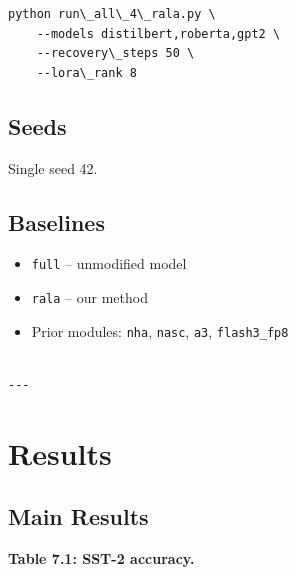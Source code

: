 \begin{lstlisting}
python run\_all\_4\_rala.py \
    --models distilbert,roberta,gpt2 \
    --recovery\_steps 50 \
    --lora\_rank 8
\end{lstlisting}

\subsection{Seeds}

Single seed 42.

\subsection{Baselines}

\begin{itemize}
\item \texttt{full} -- unmodified model
\item \texttt{rala} -- our method
\item Prior modules: \texttt{nha}, \texttt{nasc}, \texttt{a3}, \texttt{flash3\_fp8}
\end{itemize}
\begin{lstlisting}

---
\end{lstlisting}


\section{Results}

\subsection{Main Results}

\textbf{Table 7.1: SST-2 accuracy.}

